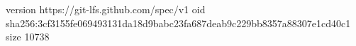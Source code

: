 version https://git-lfs.github.com/spec/v1
oid sha256:3cf3155fe069493131da18d9babc23fa687deab9c229bb8357a88307e1cd40c1
size 10738
